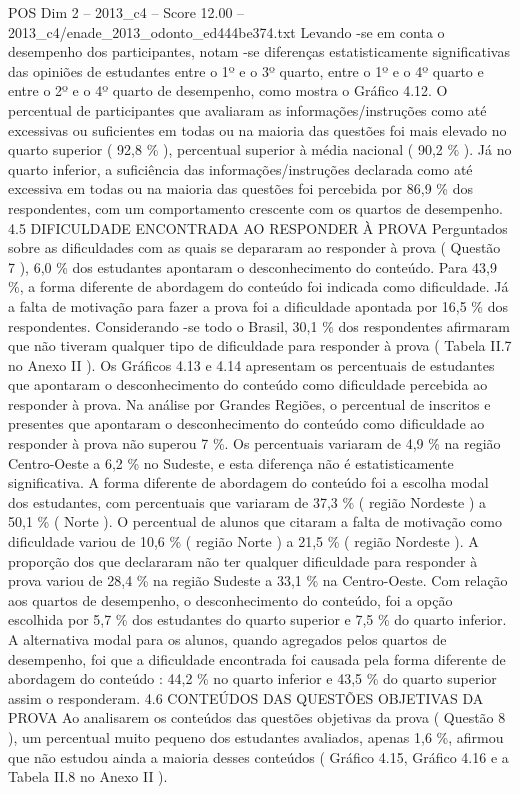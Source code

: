 \begin{textsample}{POS Dim 2 – 2013\_c4 – Score 12.00 – 2013\_c4/enade\_2013\_odonto\_ed444be374.txt}
Levando -se em conta o desempenho dos participantes, notam -se diferenças estatisticamente significativas das opiniões de estudantes entre o 1º e o 3º quarto, entre o 1º e o 4º quarto e entre o 2º e o 4º quarto de desempenho, como mostra o Gráfico 4.12.
O percentual de participantes que avaliaram as informações/instruções como até excessivas ou suficientes em todas ou na maioria das questões foi mais elevado no quarto superior ( 92,8 \% ), percentual superior à média nacional ( 90,2 \% ).
Já no quarto inferior, a suficiência das informações/instruções declarada como até excessiva em todas ou na maioria das questões foi percebida por 86,9 \% dos respondentes, com um comportamento crescente com os quartos de desempenho. 4.5 DIFICULDADE ENCONTRADA AO RESPONDER À PROVA Perguntados sobre as dificuldades com as quais se depararam ao responder à prova ( Questão 7 ), 6,0 \% dos estudantes apontaram o desconhecimento do conteúdo.
Para 43,9 \%, a forma diferente de abordagem do conteúdo foi indicada como dificuldade.
Já a falta de motivação para fazer a prova foi a dificuldade apontada por 16,5 \% dos respondentes.
Considerando -se todo o Brasil, 30,1 \% dos respondentes afirmaram que não tiveram qualquer tipo de dificuldade para responder à prova ( Tabela II.7 no Anexo II ).
Os Gráficos 4.13 e 4.14 apresentam os percentuais de estudantes que apontaram o desconhecimento do conteúdo como dificuldade percebida ao responder à prova.
Na análise por Grandes Regiões, o percentual de inscritos e presentes que apontaram o desconhecimento do conteúdo como dificuldade ao responder à prova não superou 7 \%.
Os percentuais variaram de 4,9 \% na região Centro-Oeste a 6,2 \% no Sudeste, e esta diferença não é estatisticamente significativa.
A forma diferente de abordagem do conteúdo foi a escolha modal dos estudantes, com percentuais que variaram de 37,3 \% ( região Nordeste ) a 50,1 \% ( Norte ).
O percentual de alunos que citaram a falta de motivação como dificuldade variou de 10,6 \% ( região Norte ) a 21,5 \% ( região Nordeste ).
A proporção dos que declararam não ter qualquer dificuldade para responder à prova variou de 28,4 \% na região Sudeste a 33,1 \% na Centro-Oeste.
Com relação aos quartos de desempenho, o desconhecimento do conteúdo, foi a opção escolhida por 5,7 \% dos estudantes do quarto superior e 7,5 \% do quarto inferior.
A alternativa modal para os alunos, quando agregados pelos quartos de desempenho, foi que a dificuldade encontrada foi causada pela forma diferente de abordagem do conteúdo : 44,2 \% no quarto inferior e 43,5 \% do quarto superior assim o responderam. 4.6 CONTEÚDOS DAS QUESTÕES OBJETIVAS DA PROVA Ao analisarem os conteúdos das questões objetivas da prova ( Questão 8 ), um percentual muito pequeno dos estudantes avaliados, apenas 1,6 \%, afirmou que não estudou ainda a maioria desses conteúdos ( Gráfico 4.15, Gráfico 4.16 e a Tabela II.8 no Anexo II ).

\end{textsample}
